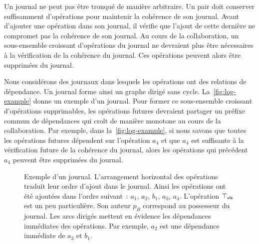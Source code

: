 Un journal ne peut pas être tronqué de manière arbitraire.
Un pair doit conserver suffisamment d'opérations pour maintenir la cohérence de son journal.
Avant d'ajouter une opération dans son journal, il vérifie que l'ajout de cette dernière ne compromet pas la cohérence de son journal.
Au cours de la collaboration, un sous-ensemble croissant d'opérations du journal ne devraient plus être nécessaires à la vérification de la cohérence du journal.
Ces opérations peuvent alors être supprimées du journal.

Nous considérons des journaux dans lesquels les opérations ont des relations de dépendance.
Un journal forme ainsi un graphe dirigé sans cycle.
La~\autoref{fig:log-example} donne un exemple d'un journal.
Pour former ce sous-ensemble croissant d'opérations supprimables, les opérations futures devraient partager un préfixe commun de dépendances qui croît de manière monotone au cours de la collaboration.
Par exemple, dans la~\autoref{fig:log-example}, si nous savons que toutes les opérations futures dépendent sur l'opération $a_4$ et que $a_4$ est suffisante à la vérification future de la cohérence du journal, alors les opérations qui précédent $a_4$ peuvent être supprimées du journal.

\begin{figure}[htb]
\centering
{}
\caption[Représentation d'un journal]{Exemple d'un journal.
L'arrangement horizontal des opérations traduit leur ordre d'ajout dans le journal.
Ainsi les opérations ont été ajoutées dans l'ordre suivant~: $a_1$, $a_2$, $b_1$, $a_3$, $a_4$.
L'opération $\top_{\operatorname{\mathsf{vis}}}$ est un peu particulière.
Son auteur $p_B$ correspond au possesseur du journal.
Les arcs dirigés mettent en évidence les dépendances immédiates des opérations.
Par exemple, $a_2$ est une dépendance immédiate de $a_3$ et $b_1$.
}\label{fig:log-example}
\end{figure}

